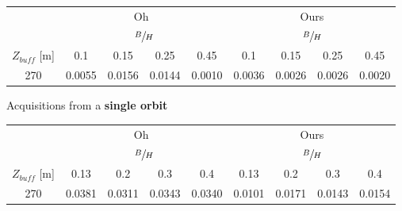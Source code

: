 \documentclass{ipol}
\begin{document}
\begin{figure}%
	\begin{center}
		\begin{subfigure}[b]{1.0\textwidth}
			\begin{minipage}[t]{1\textwidth}
				\centering
				\begin{tabular}{|c|c|c|c|c||c|c|c|c|}

\multicolumn{1}{c}{}  & \multicolumn{4}{c}{Oh~\cite{Oh2011}} & \multicolumn{4}{c}{Ours}   \\
 \cline{2-9} 
 \multicolumn{1}{c}{}  & \multicolumn{4}{|c||}{ $\sfrac{B}{H}$ } & \multicolumn{4}{|c|}{$\sfrac{B}{H}$ }  \\
 \multicolumn{1}{c|}{$Z_{buff}$ [m]}  &  0.1 &  0.15   & 0.25  &  0.45 &  0.1 &  0.15   & 0.25  &  0.45   \\
 \cline{1-9}
  
270 & 0.0055  & 0.0156    & 0.0144   &  0.0010   &  0.0036   &  0.0026  & 0.0026  & 0.0020\\
\hline 

\end{tabular}\caption{Acquisitions from a \textbf{single orbit}}
			\end{minipage}%
		\end{subfigure}
		\begin{subfigure}[b]{\textwidth}
		\begin{minipage}[t]{\textwidth}
			\centering
			\begin{tabular}{|c|c|c|c|c||c|c|c|c|}

\multicolumn{1}{c}{}  & \multicolumn{4}{c}{Oh~\cite{Oh2011}} & \multicolumn{4}{c}{Ours}   \\
 \cline{2-9} 
 \multicolumn{1}{c}{}  & \multicolumn{4}{|c||}{ $\sfrac{B}{H}$ } & \multicolumn{4}{|c|}{$\sfrac{B}{H}$ }  \\
 \multicolumn{1}{c|}{$Z_{buff}$ [m]}  &  0.13 &  0.2   & 0.3  &  0.4 &  0.13 &  0.2   & 0.3  &  0.4   \\
 \cline{1-9}
  
270  &  0.0381    &  0.0311   & 0.0343   & 0.0340 & 0.0101   & 0.0171     & 0.0143    &  0.0154   \\
\hline 


\end{tabular}
\end{minipage}
\end{subfigure}
\end{center}
\end{figure}
\end{document}
